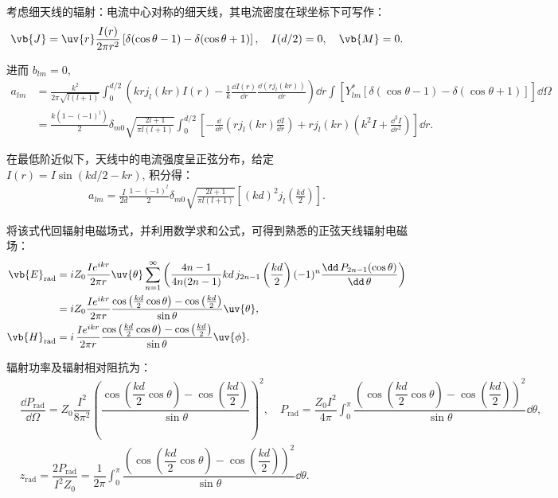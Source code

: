\begin{exbox}
	考虑细天线的辐射：电流中心对称的细天线，其电流密度在球坐标下可写作：
	\begin{align*}
		\vb{J} = \uv{r} \frac{I(r)}{2 \pi r^2}\, [\delta(\cos \theta - 1) - \delta(\cos \theta + 1)]\,, \quad I(d/2) = 0, \quad \vb{M} = 0.
	\end{align*}

	进而 \(b_{lm} = 0\),
	\begin{align*}
		a_{lm} & = \frac{k^2}{2\pi\sqrt{l(l+1)}} \int_0^{d/2} \left( k r j_l(kr) I(r) - \frac{1}{k} \frac{\dd I(r)}{\dd r} \frac{\dd(r j_l(kr))}{\dd r} \right) \dd r \int \left[ Y_{lm}^\ast [\delta(\cos\theta - 1) - \delta(\cos\theta + 1)] \right] \dd \Omega \\
		       & = \frac{k(1 - (-1)^l)}{2} \delta_{m0} \sqrt{\frac{2l+1}{\pi l(l+1)}} \int_0^{d/2} \left[ -\frac{\dd}{\dd r}\left( r j_l(kr) \frac{\dd I}{\dd r} \right) + r j_l(kr) \left( k^2 I + \frac{\dd^2 I}{\dd r^2} \right) \right] \dd r.
	\end{align*}

	在最低阶近似下，天线中的电流强度呈正弦分布，给定 \(I(r) = I \sin(k d/2 - k r)\), 积分得：
	\begin{align*}
		a_{lm} = \frac{I}{2 d} \frac{1 - (-1)^l}{2} \delta_{m0} \sqrt{\frac{2l+1}{\pi l(l+1)}} \left[ (k d)^2 j_l \left( \frac{k d}{2} \right) \right].
	\end{align*}

	将该式代回辐射电磁场式，并利用数学求和公式，可得到熟悉的正弦天线辐射电磁场：
	\begin{align*}
		\vb{E}_{\text{rad}} &= i Z_0 \frac{I e^{i k r}}{2 \pi r} \uv{\theta}\sum_{n=1}^\infty \left( \frac{4n-1}{4n(2n-1)} k d \,j_{2n-1} \left( \frac{k d}{2} \right) (-1)^n \frac{\dd\, P_{2n-1} (\cos \theta)}{\dd\,\theta} \right)
		\\&= i Z_0 \frac{I e^{i k r}}{2 \pi r} \frac{\cos \left( \frac{k d}{2} \cos \theta \right) - \cos \left( \frac{k d}{2} \right)}{\sin \theta} \uv{\theta},\\
		\vb{H}_{\text{rad}} &= i \,\frac{I e^{i k r}}{2 \pi r} \frac{\cos \left( \frac{k d}{2} \cos \theta \right) - \cos \left( \frac{k d}{2} \right)}{\sin \theta} \uv{\phi}.
	\end{align*}

	辐射功率及辐射相对阻抗为：
	\begin{align*}
		&\dfrac{\dd  P_{\text{rad}}}{\dd  \Omega} = Z_0 \dfrac{I^2}{8 \pi^2} \left( \dfrac{\cos \left( \dfrac{k d}{2} \cos \theta \right) - \cos \left( \dfrac{k d}{2} \right)}{\sin \theta} \right)^2,\quad
		P_{\text{rad}} = \dfrac{Z_0 I^2}{4 \pi} \int_0^\pi \dfrac{\left( \cos \left( \dfrac{k d}{2} \cos \theta \right) - \cos \left( \dfrac{k d}{2} \right) \right)^2}{\sin \theta} \dd \theta,\\
		&z_{\text{rad}} = \dfrac{2 P_{\text{rad}}}{I^2 Z_0} = \dfrac{1}{2 \pi} \int_0^\pi \dfrac{\left( \cos \left( \dfrac{k d}{2} \cos \theta \right) - \cos \left( \dfrac{k d}{2} \right) \right)^2}{\sin \theta} \dd \theta.
	\end{align*}


\end{exbox}
